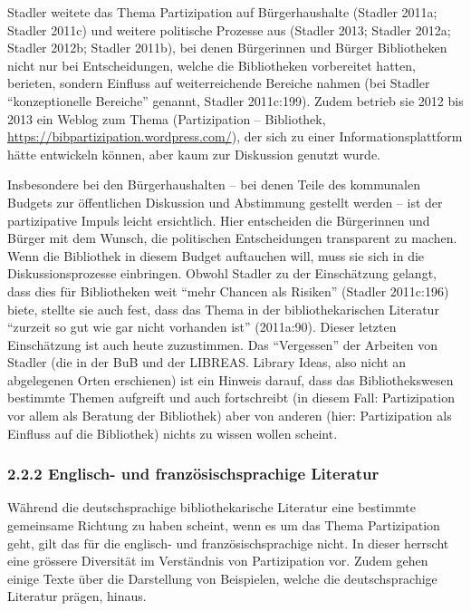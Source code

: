 \documentclass[a4paper,
fontsize=11pt,
oneside,
numbers=noperiodatend,
parskip=half-,
bibliography=totoc,
final
]{scrartcl}
\begin{document}
Stadler weitete das Thema Partizipation auf Bürgerhaushalte (Stadler
2011a; Stadler 2011c) und weitere politische Prozesse aus (Stadler 2013;
Stadler 2012a; Stadler 2012b; Stadler 2011b), bei denen Bürgerinnen und
Bürger Bibliotheken nicht nur bei Entscheidungen, welche die
Bibliotheken vorbereitet hatten, berieten, sondern Einfluss auf
weiterreichende Bereiche nahmen (bei Stadler \enquote{konzeptionelle
Bereiche} genannt, Stadler 2011c:199). Zudem betrieb sie 2012 bis 2013
ein Weblog zum Thema (Partizipation -- Bibliothek,
\url{https://bibpartizipation.wordpress.com/}), der sich zu einer
Informationsplattform hätte entwickeln können, aber kaum zur Diskussion
genutzt wurde.

Insbesondere bei den Bürgerhaushalten -- bei denen Teile des kommunalen
Budgets zur öffentlichen Diskussion und Abstimmung gestellt werden --
ist der partizipative Impuls leicht ersichtlich. Hier entscheiden die
Bürgerinnen und Bürger mit dem Wunsch, die politischen Entscheidungen
transparent zu machen. Wenn die Bibliothek in diesem Budget auftauchen
will, muss sie sich in die Diskussionsprozesse einbringen. Obwohl
Stadler zu der Einschätzung gelangt, dass dies für Bibliotheken weit
\enquote{mehr Chancen als Risiken} (Stadler 2011c:196) biete, stellte
sie auch fest, dass das Thema in der bibliothekarischen Literatur
\enquote{zurzeit so gut wie gar nicht vorhanden ist} (2011a:90). Dieser
letzten Einschätzung ist auch heute zuzustimmen. Das \enquote{Vergessen}
der Arbeiten von Stadler (die in der BuB und der LIBREAS. Library Ideas,
also nicht an abgelegenen Orten erschienen) ist ein Hinweis darauf, dass
das Bibliothekswesen bestimmte Themen aufgreift und auch fortschreibt
(in diesem Fall: Partizipation vor allem als Beratung der Bibliothek)
aber von anderen (hier: Partizipation als Einfluss auf die Bibliothek)
nichts zu wissen wollen scheint.

\hypertarget{englisch--und-franzuxf6sischsprachige-literatur}{%
\subsubsection{2.2.2 Englisch- und französischsprachige
Literatur}\label{englisch--und-franzuxf6sischsprachige-literatur}}

Während die deutschsprachige bibliothekarische Literatur eine bestimmte
gemeinsame Richtung zu haben scheint, wenn es um das Thema Partizipation
geht, gilt das für die englisch- und französischsprachige nicht. In
dieser herrscht eine grössere Diversität im Verständnis von
Partizipation vor. Zudem gehen einige Texte über die Darstellung von
Beispielen, welche die deutschsprachige Literatur prägen, hinaus.
\end{document}
